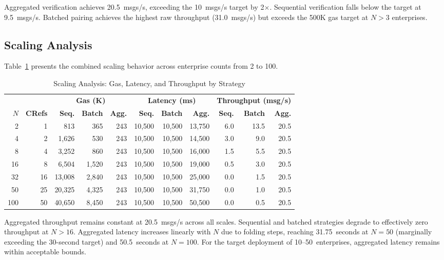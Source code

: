 \documentclass[conference]{IEEEtran}
\begin{document}
Aggregated verification achieves 20.5~msgs/s, exceeding the 10~msgs/s target
by 2$\times$. Sequential verification falls below the target at 9.5~msgs/s.
Batched pairing achieves the highest raw throughput (31.0~msgs/s) but exceeds
the 500K gas target at $N > 3$ enterprises.

\subsection{Scaling Analysis}

Table~\ref{tab:scaling} presents the combined scaling behavior across
enterprise counts from 2 to 100.

\begin{table}[t]
  \centering
  \caption{Scaling Analysis: Gas, Latency, and Throughput by Strategy}
  \label{tab:scaling}
  \begin{tabular}{@{}rr|rrr|rrr|rrr@{}}
    \toprule
    & & \multicolumn{3}{c|}{\textbf{Gas (K)}} &
    \multicolumn{3}{c|}{\textbf{Latency (ms)}} &
    \multicolumn{3}{c}{\textbf{Throughput (msg/s)}} \\
    \textbf{$N$} & \textbf{CRefs} & \textbf{Seq.} & \textbf{Batch} &
    \textbf{Agg.} & \textbf{Seq.} & \textbf{Batch} & \textbf{Agg.} &
    \textbf{Seq.} & \textbf{Batch} & \textbf{Agg.} \\
    \midrule
    2   & 1  & 813   & 365   & 243 & 10,500 & 10,500 & 13,750 & 6.0  & 13.5 & 20.5 \\
    4   & 2  & 1,626 & 530   & 243 & 10,500 & 10,500 & 14,500 & 3.0  & 9.0  & 20.5 \\
    8   & 4  & 3,252 & 860   & 243 & 10,500 & 10,500 & 16,000 & 1.5  & 5.5  & 20.5 \\
    16  & 8  & 6,504 & 1,520 & 243 & 10,500 & 10,500 & 19,000 & 0.5  & 3.0  & 20.5 \\
    32  & 16 & 13,008 & 2,840 & 243 & 10,500 & 10,500 & 25,000 & 0.0 & 1.5  & 20.5 \\
    50  & 25 & 20,325 & 4,325 & 243 & 10,500 & 10,500 & 31,750 & 0.0 & 1.0  & 20.5 \\
    100 & 50 & 40,650 & 8,450 & 243 & 10,500 & 10,500 & 50,500 & 0.0 & 0.5  & 20.5 \\
    \bottomrule
  \end{tabular}
\end{table}

Aggregated throughput remains constant at 20.5~msgs/s across all scales.
Sequential and batched strategies degrade to effectively zero throughput at
$N > 16$. Aggregated latency increases linearly with $N$ due to folding
steps, reaching 31.75~seconds at $N{=}50$ (marginally exceeding the 30-second
target) and 50.5~seconds at $N{=}100$. For the target deployment of
10--50~enterprises, aggregated latency remains within acceptable bounds.
\end{document}
